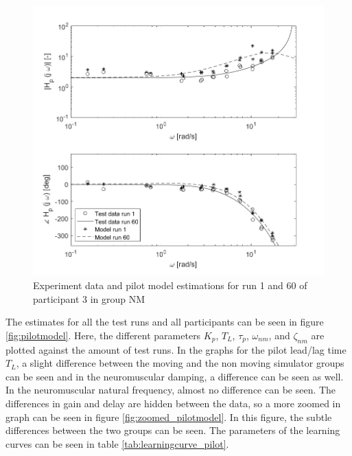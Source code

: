 \documentclass[conference]{IEEEtran}
\begin{document}
\begin{figure}[h!]
    \centering
    \includegraphics[width=\linewidth]{images/run1_60_participant1NM.png}
    \caption{Experiment data and pilot model estimations for run 1 and 60 of participant 3 in group NM}
    \label{fig:pilotmodel_NM}
\end{figure}

The estimates for all the test runs and all participants can be seen in figure \ref{fig:pilotmodel}. Here, the different parameters $K_p$, $T_L$, $\tau_p$, $\omega_{nm}$, and $\zeta_{nm}$ are plotted against the amount of test runs. In the graphs for the pilot lead/lag time $T_L$, a slight difference between the moving and the non moving simulator groups can be seen and in the neuromuscular damping, a difference can be seen as well. In the neuromuscular natural frequency, almost no difference can be seen. The differences in gain and delay are hidden between the data, so a more zoomed in graph can be seen in figure \ref{fig:zoomed_pilotmodel}. In this figure, the subtle differences between the two groups can be seen. The parameters of the learning curves can  be seen in table \ref{tab:learningcurve_pilot}. \\
\end{document}
